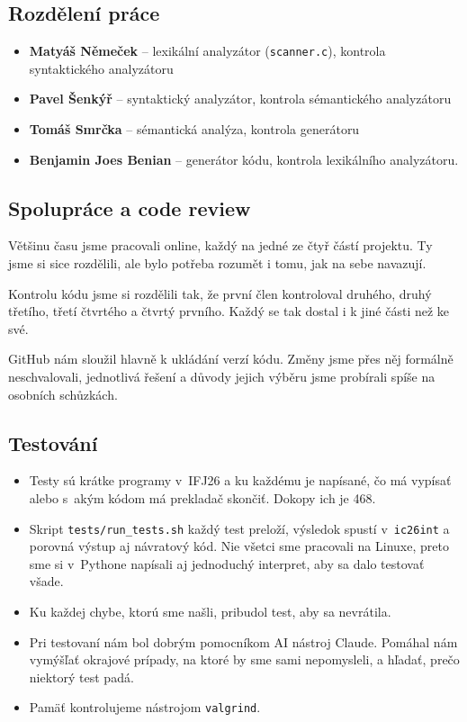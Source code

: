 \documentclass[a4paper,11pt]{article}
\newcommand{\id}[1]{\texttt{#1}}
\begin{document}
\subsection{Rozdělení práce}
\begin{itemize}
  \item \textbf{Matyáš Němeček} -- lexikální analyzátor (\id{scanner.c}), kontrola syntaktického analyzátoru
  \item \textbf{Pavel Šenkýř} -- syntaktický analyzátor, kontrola sémantického analyzátoru
  \item \textbf{Tomáš Smrčka} -- sémantická analýza, kontrola generátoru
  \item \textbf{Benjamin Joes Benian} -- generátor kódu, kontrola lexikálního analyzátoru.
\end{itemize}



\subsection{Spolupráce a code review}
Většinu času jsme pracovali online, každý na jedné ze čtyř částí projektu. Ty jsme si sice rozdělili, ale bylo potřeba rozumět i tomu, jak na sebe navazují.

Kontrolu kódu jsme si rozdělili tak, že první člen kontroloval druhého, druhý třetího, třetí čtvrtého a čtvrtý prvního. Každý se tak dostal i k jiné části než ke své.

GitHub nám sloužil hlavně k ukládání verzí kódu. Změny jsme přes něj formálně neschvalovali, jednotlivá řešení a důvody jejich výběru jsme probírali spíše na osobních schůzkách.

\subsection{Testování}
\begin{itemize}
  \item Testy sú krátke programy v~IFJ26 a ku každému je napísané, čo má
        vypísať alebo s~akým kódom má prekladač skončiť. Dokopy ich je 468.
  \item Skript \id{tests/run\_tests.sh} každý test preloží, výsledok spustí
        v~\id{ic26int} a porovná výstup aj návratový kód. Nie všetci sme
        pracovali na Linuxe, preto sme si v~Pythone napísali aj jednoduchý
        interpret, aby sa dalo testovať všade.
  \item Ku každej chybe, ktorú sme našli, pribudol test, aby sa nevrátila.
  \item Pri testovaní nám bol dobrým pomocníkom AI nástroj Claude. Pomáhal
        nám vymýšľať okrajové prípady, na ktoré by sme sami nepomysleli,
        a hľadať, prečo niektorý test padá.
  \item Pamäť kontrolujeme nástrojom \id{valgrind}.
\end{itemize}
\end{document}
